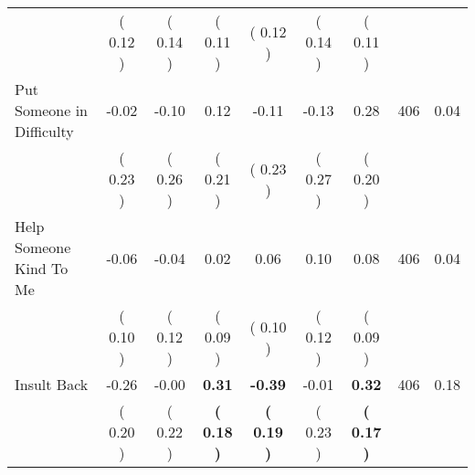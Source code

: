 \begin{tabular}{lcccccccc}
 & (     0.12 ) & (     0.14 ) & (     0.11 ) & (     0.12 ) & (     0.14 ) & (     0.11 ) & \\
Put Someone in Difficulty &     -0.02 &     -0.10 &      0.12 &     -0.11 &     -0.13 &      0.28 & 406 &       0.04 \\ 
 & (     0.23 ) & (     0.26 ) & (     0.21 ) & (     0.23 ) & (     0.27 ) & (     0.20 ) & \\
Help Someone Kind To Me &     -0.06 &     -0.04 &      0.02 &      0.06 &      0.10 &      0.08 & 406 &       0.04 \\ 
 & (     0.10 ) & (     0.12 ) & (     0.09 ) & (     0.10 ) & (     0.12 ) & (     0.09 ) & \\
Insult Back &     -0.26 &     -0.00 & \textbf{     0.31} & \textbf{    -0.39} &     -0.01 & \textbf{     0.32} & 406 &       0.18 \\ 
 & (     0.20 ) & (     0.22 ) & \textbf{(     0.18 )} & \textbf{(     0.19 )} & (     0.23 ) & \textbf{(     0.17 )} & \\
\bottomrule
\end{tabular}
